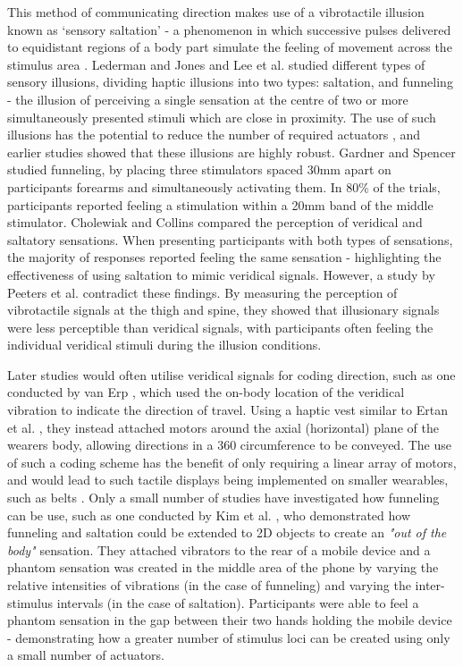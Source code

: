 \documentclass{interim}
\begin{document}
This method of communicating direction makes use of a vibrotactile illusion known as ‘sensory saltation' - a phenomenon in which successive pulses delivered to equidistant regions of a body part simulate the feeling of movement across the stimulus area \cite{geldard1975sensory}. Lederman and Jones \cite{5710913} and Lee et al. \cite{s150407913} studied different types of sensory illusions, dividing haptic illusions into two types: saltation, and funneling - the illusion of perceiving a single sensation at the centre of two or more simultaneously presented stimuli which are close in proximity. The use of such illusions has the potential to reduce the number of required actuators \cite{10.1007/s00779-015-0894-4}, and earlier studies showed that these illusions are highly robust. Gardner and Spencer \cite{gardner1972sensory} studied funneling, by placing three stimulators spaced 30mm apart on participants forearms and simultaneously activating them. In 80\% of the trials, participants reported feeling a stimulation within a 20mm band of the middle stimulator. Cholewiak and Collins \cite{cholewiak2000generation} compared the perception of veridical and saltatory sensations. When presenting participants with both types of sensations, the majority of responses reported feeling the same sensation - highlighting the effectiveness of using saltation to mimic veridical signals. However, a study by Peeters et al. \cite{peeters2019vibrotactile} contradict these findings. By measuring the perception of vibrotactile signals at the thigh and spine, they showed that illusionary signals were less perceptible than veridical signals, with participants often feeling the individual veridical stimuli during the illusion conditions.

Later studies would often utilise veridical signals for coding direction, such as one conducted by van Erp \cite{van2000tactile}, which used the on-body location of the veridical vibration to indicate the direction of travel. Using a haptic vest similar to Ertan et al. \cite{729547}, they instead attached motors around the axial (horizontal) plane of the wearers body, allowing directions in a 360\degree{} circumference to be conveyed. The use of such a coding scheme has the benefit of only requiring a linear array of motors, and would lead to such tactile displays being implemented on smaller wearables, such as belts \cite{10.1145/1613858.1613911, 10.1145/2449396.2449450, 10.1145/1060581.1060585}. Only a small number of studies have investigated how funneling can be use, such as one conducted by Kim et al. \cite{10.1007/s00779-015-0894-4}, who demonstrated how funneling and saltation could be extended to 2D objects to create an \textit{"out of the body"} sensation. They attached vibrators to the rear of a mobile device and a phantom sensation was created in the middle area of the phone by varying the relative intensities of vibrations (in the case of funneling) and varying the inter-stimulus intervals (in the case of saltation). Participants were able to feel a phantom sensation in the gap between their two hands holding the mobile device - demonstrating how a greater number of stimulus loci can be created using only a small number of actuators.
\end{document}
